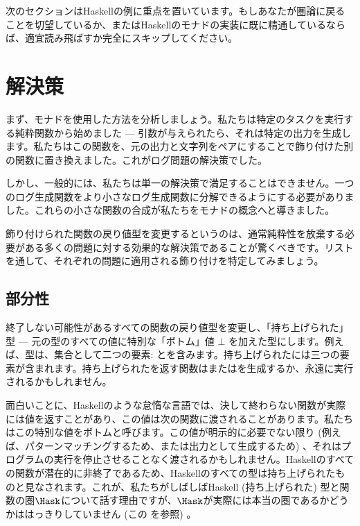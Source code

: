 次のセクションはHaskellの例に重点を置いています。もしあなたが圏論に戻ることを切望しているか、またはHaskellのモナドの実装に既に精通しているならば、適宜読み飛ばすか完全にスキップしてください。

\section{解決策}

まず、モナドを使用した方法を分析しましょう。私たちは特定のタスクを実行する純粋関数から始めました --- 引数が与えられたら、それは特定の出力を生成します。私たちはこの関数を、元の出力と文字列をペアにすることで飾り付けた別の関数に置き換えました。これがログ問題の解決策でした。

しかし、一般的には、私たちは単一の解決策で満足することはできません。一つのログ生成関数をより小さなログ生成関数に分解できるようにする必要がありました。これらの小さな関数の合成が私たちをモナドの概念へと導きました。

飾り付けられた関数の戻り値型を変更するというのは、通常純粋性を放棄する必要がある多くの問題に対する効果的な解決策であることが驚くべきです。リストを通して、それぞれの問題に適用される飾り付けを特定してみましょう。

\subsection{部分性}

終了しない可能性があるすべての関数の戻り値型を変更し、「持ち上げられた」型 --- 元の型のすべての値に特別な「ボトム」値 $\bot$ を加えた型にします。例えば、型は、集合として二つの要素: とを含みます。持ち上げられたには三つの要素が含まれます。持ち上げられたを返す関数はまたはを生成するか、永遠に実行されるかもしれません。

面白いことに、Haskellのような怠惰な言語では、決して終わらない関数が実際には値を返すことがあり、この値は次の関数に渡されることがあります。私たちはこの特別な値をボトムと呼びます。この値が明示的に必要でない限り (例えば、パターンマッチングするため、または出力として生成するため) 、それはプログラムの実行を停止させることなく渡されるかもしれません。Haskellのすべての関数が潜在的に非終了であるため、Haskellのすべての型は持ち上げられたものと見なされます。これが、私たちがしばしばHaskell (持ち上げられた) 型と関数の圏$\Hask$について話す理由ですが、$\Hask$が実際には本当の圏であるかどうかははっきりしていません (この
を参照) 。

